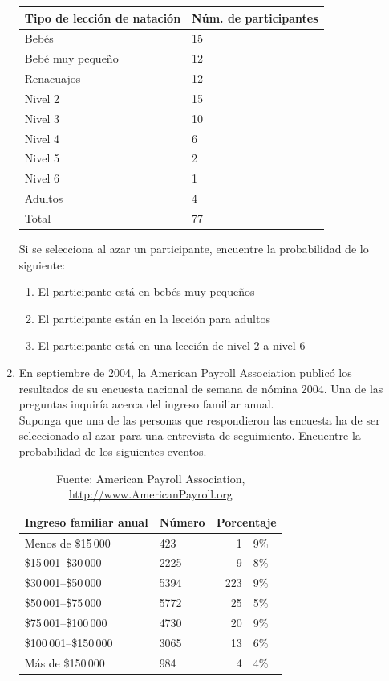 \documentclass[11pt,twoside]{article}
\begin{document}
\begin{enumerate}
\begin{center}
\begin{tabular}{ll}
Tipo de lección de natación & Núm. de participantes\\ \hline
Bebés & 15\\
Bebé muy pequeño & 12\\
Renacuajos & 12\\
Nivel 2 & 15\\
Nivel 3 & 10\\
Nivel 4 & 6\\
Nivel 5 & 2\\
Nivel 6 & 1\\
Adultos & 4\\ \hline
Total & 77
\end{tabular}
\end{center}
Si se selecciona al azar un participante, encuentre la probabilidad de lo siguiente:
\begin{enumerate}
 \item El participante está en bebés muy pequeños
 \item El participante están en la lección para adultos
 \item El participante está en una lección de nivel 2 a nivel 6
\end{enumerate}
\item En septiembre de 2004, la American Payroll Association publicó los resultados de su encuesta nacional de semana de nómina 2004. Una de las preguntas inquiría acerca del ingreso familiar anual.\\
Suponga que una de las personas que respondieron las encuesta ha de ser seleccionado al azar para una entrevista de seguimiento. Encuentre la probabilidad de los siguientes eventos.
\begin{table}
\begin{center}
\begin{tabular}{llr@{.}l}
Ingreso familiar anual & Número &\multicolumn{2}{l}{Porcentaje} \\ \hline
Menos de \$15\,000 & 423 & 1&9\% \\
\$15\,001--\$30\,000 & 2225 & 9&8\%\\
\$30\,001--\$50\,000 & 5394 & 223&9\%\\
\$50\,001--\$75\,000 & 5772 & 25&5\%\\
\$75\,001--\$100\,000 & 4730 & 20&9\%\\
\$100\,001--\$150\,000 & 3065 & 13&6\%\\
Más de \$150\,000 & 984 & 4&4\% \\\hline
\end{tabular}
\end{center}\caption{Fuente: American Payroll Association, \url{http://www.AmericanPayroll.org}}
            \end{table} 


\end{enumerate}
\end{document}
